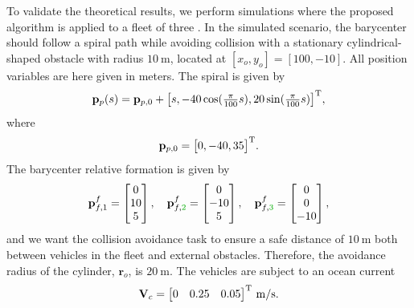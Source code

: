 To validate the theoretical results, we perform simulations where the proposed algorithm is applied to a fleet of three  \cite{sousa_LAUV_2012}. In the simulated scenario, the barycenter should follow a spiral path while avoiding collision with a stationary cylindrical-shaped obstacle with radius $\SI{10}{\meter}$, located at $[x_o,y_o] = [100,-10]$. All position variables are here given in meters. The spiral is given by
\begin{equation}
    \mathbf{p}_p(s) = \mathbf{p}_{p,0} + \bigl[s, -40 \cos(\tfrac{\pi}{100} s), 20 \sin(\tfrac{\pi}{100} s)\bigr]^{\mathrm{T}},
\end{equation}
where \begin{equation}
    \mathbf{p}_{p,0} = \bigl[ 0, -40, 35 \bigr]^{\mathrm{T}}.
\end{equation}
The barycenter relative formation is given by
\begin{equation}
    \mathbf{p}_{f,1}^f = \begin{bmatrix}0 \\ 10 \\ 5\end{bmatrix}, \quad \mathbf{p}_{f,\dm{2}}^f = \begin{bmatrix}0 \\ -10 \\ 5\end{bmatrix},\quad \mathbf{p}_{f,\dm{3}}^f = \begin{bmatrix}0 \\ 0 \\ -10\end{bmatrix},
\end{equation}
and we want the collision avoidance task to ensure a safe distance of $\SI{10}{\meter}$ both between vehicles in the fleet and external obstacles. Therefore, the avoidance radius of the cylinder, $\mathbf{r}_o$, is $\SI{20}{\meter}$. The vehicles are subject to an ocean current 
\begin{equation}
    \mathbf{V}_c = \begin{bmatrix}
        0 & 0.25 & 0.05
    \end{bmatrix}^{\mathrm{T}} \,\mathrm{m/s}.
\end{equation}

